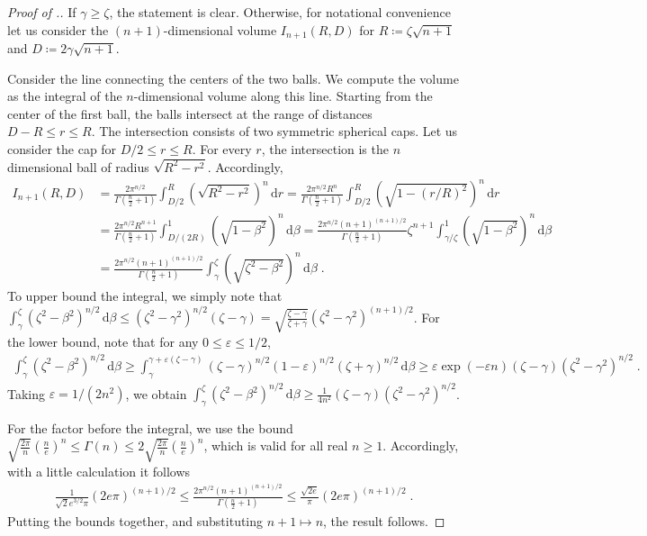 \documentclass{article}
\newcommand{\eps}{\varepsilon}
\theoremstyle{plain}
\theoremstyle{plain}
\theoremstyle{plain}
\theoremstyle{plain}
\theoremstyle{plain}
\theoremstyle{plain}
\theoremstyle{plain}
\theoremstyle{plain}
\theoremstyle{plain}
\theoremstyle{plain}
\theoremstyle{remark}
\theoremstyle{remark}
\theoremstyle{remark}
\theoremstyle{plain}
\begin{document}
\begin{proof}[Proof of .]
If $\gamma\ge \zeta$, the statement
is clear. Otherwise,
for notational convenience let us
consider the $(n+1)$-dimensional volume $I_{n+1}(R,D)$
for $R\coloneqq\zeta\sqrt{n+1}$
and $D\coloneqq 2\gamma\sqrt{n+1}$.

Consider the line connecting the centers of the two balls. We compute the volume as the integral
of the $n$-dimensional volume along this line. Starting
from the center of the first ball, the balls intersect at the range of
distances $D-R\le r\le R$. The intersection consists of two symmetric
spherical caps. Let us consider the cap for $D/2\le r\le R$. For every
$r$, the intersection is the $n$ dimensional ball of radius $\sqrt{R^2-r^2}$. Accordingly,
\begin{align*}
I_{n+1}(R,D)&=
\frac{2\pi^{n/2}}{\Gamma\left(\frac{n}{2}+1\right)}\int_{D/2}^{R}
\left(\sqrt{R^2-r^2}\right)^{n}\,\mathrm{d}r
=\frac{2\pi^{n/2}R^n}{\Gamma\left(\frac{n}{2}+1\right)}\int_{D/2}^{R}
\left(\sqrt{1-(r/R)^2}\right)^{n}\,\mathrm{d}r\\
&=
\frac{2\pi^{n/2}R^{n+1}}{\Gamma\left(\frac{n}{2}+1\right)}\int_{D/(2R)}^{1}
\left(\sqrt{1-\beta^2}\right)^{n}\,\mathrm{d}\beta
=\frac{2\pi^{n/2}(n+1)^{(n+1)/2}}{\Gamma\left(\frac{n}{2}+1\right)}\zeta^{n+1}
\int_{\gamma/\zeta}^{1}
\left(\sqrt{1-\beta^2}\right)^{n}\,\mathrm{d}\beta\\
&=\frac{2\pi^{n/2}(n+1)^{(n+1)/2}}{\Gamma\left(\frac{n}{2}+1\right)}\int_{\gamma}^{\zeta}
\left(\sqrt{\zeta^2-\beta^2}\right)^{n}\,\mathrm{d}\beta\;.
\end{align*}
To upper bound the integral, we simply note that
$\int_{\gamma}^\zeta(\zeta^2-\beta^2)^{n/2}\,\mathrm{d}\beta
\le(\zeta^2-\gamma^2)^{n/2}(\zeta-\gamma)=\sqrt{\frac{\zeta-\gamma}{\zeta+\gamma}}(\zeta^2-\gamma^2)^{(n+1)/2}$. For the lower bound, note that
for any $0\le\eps\le 1/2$,
\begin{align*}
\int_{\gamma}^{\zeta}
(\zeta^2-\beta^2)^{n/2}\,\mathrm{d}\beta
\ge \int_{\gamma}^{\gamma+\eps(\zeta-\gamma)}
(\zeta-\gamma)^{n/2}(1-\eps)^{n/2}(\zeta+\gamma)^{n/2}\,\mathrm{d}\beta
\ge \eps\exp(-\eps n)(\zeta-\gamma)(\zeta^2-\gamma^2)^{n/2}\;.
\end{align*}
Taking $\eps=1/(2n^2)$, we obtain
$\int_{\gamma}^\zeta(\zeta^2-\beta^2)^{n/2}\,\mathrm{d}\beta
\ge \frac{1}{4n^2}(\zeta-\gamma)(\zeta^2-\gamma^2)^{n/2}$.

For the factor before the integral, we use the bound
$\sqrt{\frac{2\pi}{n}}\left(\frac{n}{e}\right)^n\le
\Gamma(n)\le 2\sqrt{\frac{2\pi}{n}}\left(\frac{n}{e}\right)^n$,
which is valid for all real $n\ge 1$. Accordingly,
with a little calculation it follows
\begin{align*}
\frac{1}{\sqrt{2}e^{3/2}\pi}
(2e\pi)^{(n+1)/2}
\le
\frac{2\pi^{n/2}(n+1)^{(n+1)/2}}{\Gamma\left(\frac{n}{2}+1\right)}
\le
\frac{\sqrt{2e}}{\pi}
(2e\pi)^{(n+1)/2}\;.
\end{align*}
Putting the bounds together, and substituting
$n+1\mapsto n$, the result follows.
\end{proof}
\end{document}
